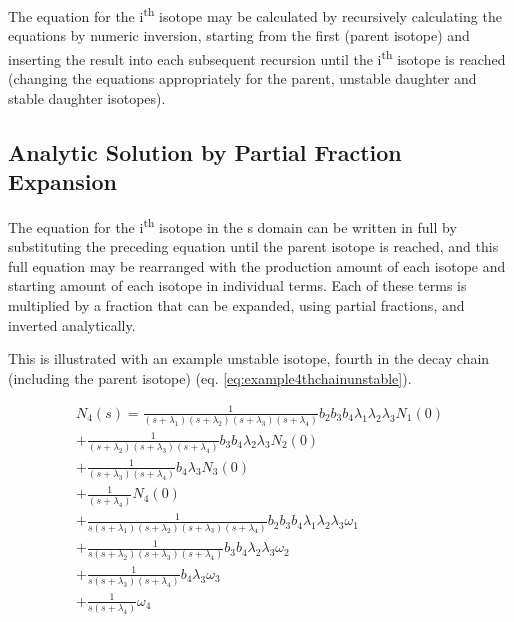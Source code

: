 The equation for the i\textsuperscript{th} isotope may be calculated by recursively calculating the equations by numeric inversion, starting from the first (parent isotope) and inserting the result into each subsequent recursion until the i\textsuperscript{th} isotope is reached (changing the equations appropriately for the parent, unstable daughter and stable daughter isotopes).


\subsection{Analytic Solution by Partial Fraction Expansion}
\label{section:activitysolution}

The equation for the i\textsuperscript{th} isotope in the s domain can be written in full by substituting the preceding equation until the parent isotope is reached, and this full equation may be rearranged with the production amount of each isotope and starting amount of each isotope in individual terms.  Each of these terms is multiplied by a fraction that can be expanded, using partial fractions, and inverted analytically.

This is illustrated with an example unstable isotope, fourth in the decay chain (including the parent isotope) (eq. \ref{eq:example4thchainunstable}).

\begin{equation}
\begin{split}
N_{4}(s) =
\frac{1}{(s+\lambda_1)(s+\lambda_2)(s+\lambda_3)(s+\lambda_4)} b_{2} b_{3} b_{4} \lambda_1 \lambda_2 \lambda_3 N_{1}(0) \\
+ \frac{1}{(s+\lambda_2)(s+\lambda_3)(s+\lambda_4)} b_{3} b_{4} \lambda_2 \lambda_3 N_{2}(0) \\
+ \frac{1}{(s+\lambda_3)(s+\lambda_4)} b_{4} \lambda_3 N_{3}(0) \\
+ \frac{1}{(s+\lambda_4)} N_{4}(0) \\
+ \frac{1}{s(s+\lambda_1)(s+\lambda_2)(s+\lambda_3)(s+\lambda_4)} b_{2} b_{3} b_{4} \lambda_1 \lambda_2 \lambda_3 \omega_{1} \\
+ \frac{1}{s(s+\lambda_2)(s+\lambda_3)(s+\lambda_4)} b_{3} b_{4} \lambda_2 \lambda_3 \omega_{2} \\
+ \frac{1}{s(s+\lambda_3)(s+\lambda_4)} b_{4} \lambda_3 \omega_{3} \\
+ \frac{1}{s(s+\lambda_4)} \omega_{4}
\end{split}
\label{eq:example4thchainunstable}
\end{equation}

